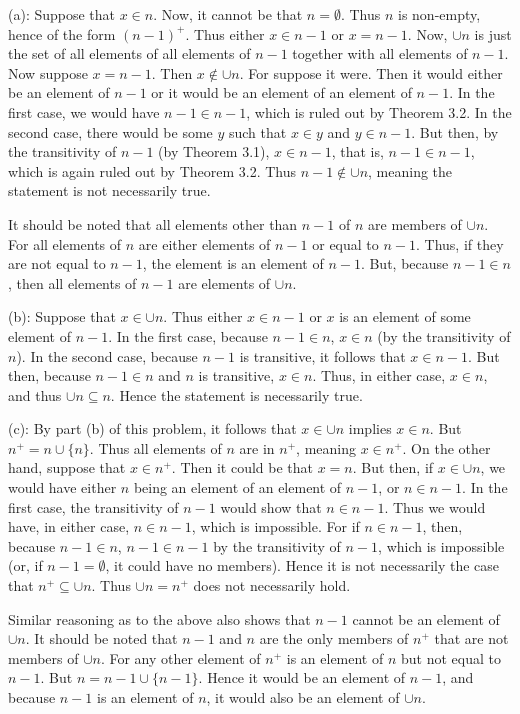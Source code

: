 \documentclass{article}
\theoremstyle{definition}
\begin{document}
(a): Suppose that $x\in n$. Now, it cannot be that $n=\emptyset$. Thus $n$ is non-empty, hence of the form $(n-1)^+$. Thus either $x\in n-1$ or $x=n-1$. 
Now, $\cup n$ is just the set of all elements 
of all elements of $n-1$ together with all elements of $n-1$. Now suppose $x=n-1$. Then $x\notin\cup n$. For suppose it were. Then it would either be an element of $n-1$ or it would be 
an element of an element of $n-1$. In the first case, we would have $n-1\in n-1$, which is ruled out by Theorem 3.2. In the second case, there would be some $y$ such that 
$x\in y$ and $y\in n-1$. But then, by the transitivity of $n-1$ (by Theorem 3.1), $x\in n-1$, that is, $n-1\in n-1$, which is again ruled out by Theorem 3.2. Thus $n-1\notin\cup n$, meaning 
the statement is not necessarily true.


It should be noted that all elements other than $n-1$ of $n$ are members of $\cup n$. For all elements of $n$ are either elements of $n-1$ or equal to $n-1$. Thus, if 
they are not equal to $n-1$, the element is an element of $n-1$. But, because $n-1\in n$, then all elements of $n-1$ are elements of $\cup n$.


(b): Suppose that $x\in\cup n$. Thus either $x\in n-1$ or $x$ is an element of some element of $n-1$. In the first case, because $n-1\in n$, $x\in n$ (by the transitivity of $n$). 
In the second case, because 
$n-1$ is transitive, it follows that $x\in n-1$. But then, because $n-1\in n$ and $n$ is transitive, $x\in n$. Thus, in either case, $x\in n$, and thus $\cup n\subseteq n$. Hence the statement 
is necessarily true.


(c): By part (b) of this problem, it follows that $x\in\cup n$ implies $x\in n$. But $n^+=n\cup\{n\}$. Thus all elements of $n$ are in $n^+$, meaning $x\in n^+$. On the other hand, suppose that 
$x\in n^+$. Then it could be that $x=n$. But then, if $x\in\cup n$, we would have either $n$ being an element of an element of $n-1$, or $n\in n-1$. In the first case, the transitivity of $n-1$ 
would 
show that $n\in n-1$. Thus we would have, in either case, $n\in n-1$, which is impossible. For if $n\in n-1$, then, because $n-1\in n$, $n-1\in n-1$ by the transitivity of $n-1$, which is 
impossible (or, if $n-1=\emptyset$, it could have no members). Hence it is not necessarily the case that $n^+\subseteq\cup n$. Thus $\cup n=n^+$ does not necessarily hold. 


Similar reasoning as to the above also shows that $n-1$ cannot be an element of $\cup n$. It should be noted that $n-1$ and $n$ are the only members of $n^+$ that are not members of 
$\cup n$. For any other element of $n^+$ is an element of $n$ but not equal to $n-1$. But $n=n-1\cup\{n-1\}$. Hence it would be an element of $n-1$, and because 
$n-1$ is an element of $n$, it would also be an element of $\cup n$.
\end{document}
